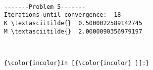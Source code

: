 \documentclass[12pt]{article}
\begin{document}
\begin{center}
\end{center}
{ \hspace*{\fill} \\}

\begin{Verbatim}[commandchars=\\\{\}]
-------Problem 5-------
Iterations until convergence:  18
K \textasciitilde{}  0.5000022589142745
M \textasciitilde{}  2.0000090356979197

\end{Verbatim}

\begin{center}
\end{center}
{ \hspace*{\fill} \\}

\begin{Verbatim}[commandchars=\\\{\}]
{\color{incolor}In [{\color{incolor} }]:} 
\end{Verbatim}
	
\end{document}
